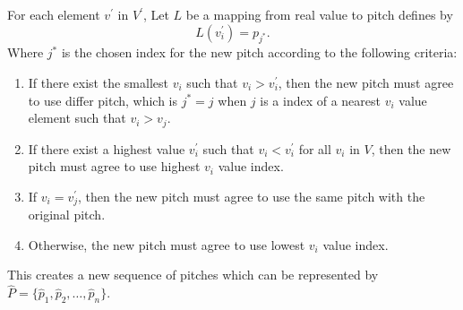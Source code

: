 \documentclass[11pt]{article}
\begin{document}
For each element $v^\prime$ in $V^\prime$, Let $L$ be a mapping from real value to pitch defines by 
$$L(v^\prime_i) = p_{j^*}.$$ 
Where $j^*$ is the chosen index for the new pitch according to the following criteria:
\begin{enumerate}
  \item If there exist the smallest $v_i$ such that $v_i > v^\prime_i$, then the new pitch must agree to use differ pitch, which is $j^* = j$ when $j$ is a index of a nearest $v_i$ value element such that $v_i > v_j$.
  \item If there exist a highest value $v^\prime_i$ such that $v_i < v^\prime_i$ for all $v_i$ in $V$, then the new pitch must agree to use highest $v_i$ value index. 
  \item If $v_i = v^\prime_j$, then the new pitch must agree to use the same pitch with the original pitch. 
  \item Otherwise, the new pitch must agree to use lowest $v_i$ value index.
\end{enumerate}
This creates a new sequence of pitches which can be represented by $\hat{P} =\{ \hat{p}_1, \hat{p}_2, \dots, \hat{p}_n \}$.
\end{document}
